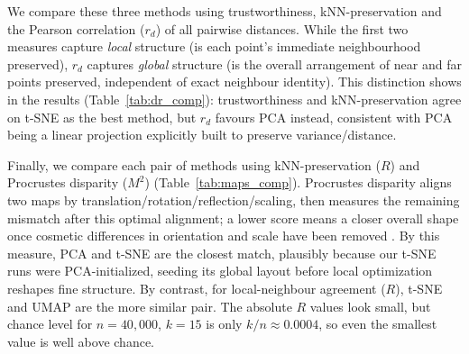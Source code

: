 \documentclass[11pt,a4paper]{article}
\newcommand{\tsne}{t-SNE}
\newcommand{\trust}{trustworthiness}
\newcommand{\knnp}{kNN-preservation}
\begin{document}
We compare these three methods using \trust{}, \knnp{} and the Pearson correlation ($r_d$) of all
pairwise distances. While the first two measures capture \emph{local} structure (is each point's immediate neighbourhood
preserved), $r_d$ captures \emph{global} structure (is the overall arrangement of near and far
points preserved, independent of exact neighbour identity). This distinction shows in the results (Table~\ref{tab:dr_comp}): \trust{} and \knnp{} agree on \tsne{} as the best method, but $r_d$ favours
PCA instead, consistent with PCA being a linear projection explicitly built to preserve variance/distance.

\begin{table}[h]
  \centering
  \begin{minipage}{0.62\linewidth}
    \centering
    {\footnotesize}
    \caption{PCA, \tsne{} and UMAP: local structure via \trust{} ($T$) and \knnp{} ($R$), global
    structure via Pearson correlation ($r_d$) of pairwise distances. $T,R$ use $k=15$. Green: best per
    column; red: worst.}
    \label{tab:dr_comp}
  \end{minipage}
  \hfill
  \begin{minipage}{0.34\linewidth}
    \centering
    {\footnotesize}
    \caption{Pairwise \knnp{} ($R$, local) and Procrustes disparity ($M^2$, aligned global shape).}
    \label{tab:maps_comp}
  \end{minipage}
\end{table}

Finally, we compare each pair of methods using \knnp{} ($R$) and Procrustes disparity ($M^2$)
(Table~\ref{tab:maps_comp}). Procrustes disparity aligns two maps by translation/rotation/reflection/scaling, then measures the remaining mismatch after this optimal alignment;
a lower score means a closer overall shape once cosmetic differences in orientation and scale have been
removed \citep{scipy2020}.
By this measure, PCA and \tsne{} are the closest match, plausibly because our \tsne{} runs were PCA-initialized, seeding
its global layout before local optimization reshapes fine structure. By contrast, for local-neighbour
agreement ($R$), \tsne{} and UMAP are the more similar pair. The absolute $R$ values look small, but
chance level for $n=40{,}000$, $k=15$ is only $k/n\approx0.0004$, so even the smallest value is well
above chance.





\end{document}
